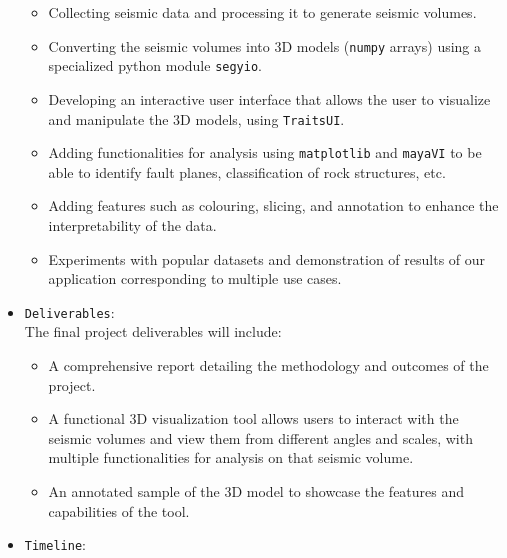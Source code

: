 \documentclass[11pt,a4paper]{article}
\begin{document}
\begin{itemize}
    \begin{itemize}
        \item Collecting seismic data and processing it to generate seismic volumes.
        \item Converting the seismic volumes into 3D models (\verb!numpy! arrays) using a specialized python module \verb!segyio!.
        \item Developing an interactive user interface that allows the user to visualize and manipulate the 3D models, using \verb!TraitsUI!.
        \item Adding functionalities for analysis using \verb!matplotlib! and \verb!mayaVI! to be able to identify fault planes, classification of rock structures, etc.
        \item Adding features such as colouring, slicing, and annotation to enhance the interpretability of the data.
        \item Experiments with popular datasets and demonstration of results of our application corresponding to multiple use cases.
    \end{itemize}

    \item \texttt{Deliverables}:\\
    
    The final project deliverables will include:
    \begin{itemize}
        \item A comprehensive report detailing the methodology and outcomes of the project.
        \item A functional 3D visualization tool allows users to interact with the seismic volumes and view them from different angles and scales, with multiple functionalities for analysis on that seismic volume.
        \item An annotated sample of the 3D model to showcase the features and capabilities of the tool.
    \end{itemize}
    \newpage
    
    \item \texttt{Timeline}:


\end{itemize}
\end{document}
